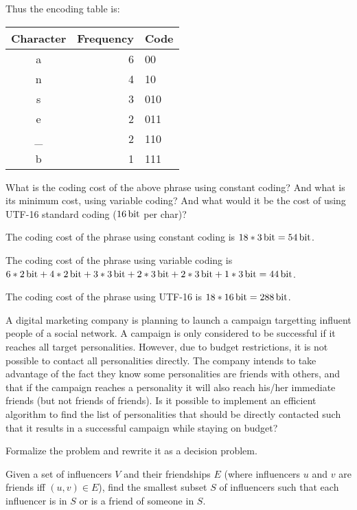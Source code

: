 \documentclass{cal}
\begin{document}
{Thus the encoding table is:

\begin{center} \begin{tabular}{c | r l}
    \textbf{Character} & \textbf{Frequency} & \textbf{Code} \\ \hline
    a  & 6 & 00 \\
    n  & 4 & 10 \\
    s  & 3 & 010 \\
    e  & 2 & 011 \\
    \_ & 2 & 110 \\
    b  & 1 & 111
\end{tabular} \end{center}

What is the coding cost of the above phrase using constant coding? And what is its minimum cost, using variable coding? And what would it be the cost of using UTF-16 standard coding ($\SI{16}{\bit}$ per char)?

\ansseparator

The coding cost of the phrase using constant coding is $18*\SI{3}{\bit}=\SI{54}{\bit}$.

The coding cost of the phrase using variable coding is $6*\SI{2}{\bit}+4*\SI{2}{\bit}+3*\SI{3}{\bit}+2*\SI{3}{\bit}+2*\SI{3}{\bit}+1*\SI{3}{\bit} = \SI{44}{\bit}$.

The coding cost of the phrase using UTF-16 is $18*\SI{16}{\bit}=\SI{288}{\bit}$.

\newpage

A digital marketing company is planning to launch a campaign targetting influent people of a social network. A campaign is only considered to be successful if it reaches all target personalities. However, due to budget restrictions, it is not possible to contact all personalities directly. The company intends to take advantage of the fact they know some personalities are friends with others, and that if the campaign reaches a personality it will also reach his/her immediate friends (but not friends of friends). Is it possible to implement an efficient algorithm to find the list of personalities that should be directly contacted such that it results in a successful campaign while staying on budget?

Formalize the problem and rewrite it as a decision problem.

\ansseparator

Given a set of influencers $V$ and their friendships $E$ (where influencers $u$ and $v$ are friends iff $(u,v) \in E$), find the smallest subset $S$ of influencers such that each influencer is in $S$ or is a friend of someone in $S$.

}
\end{document}
